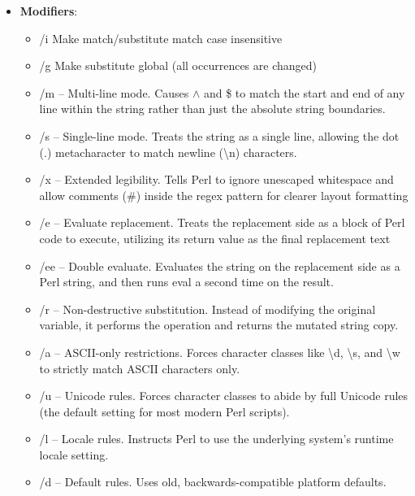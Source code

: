 \documentclass{report}
\begin{document}
\begin{itemize}
            \bigbreak \noindent 
            In Perl, \$1, \$2, \$3 (and so on) are special variables that hold captured text from the most recent successful regular expression match.
        \item \textbf{Modifiers}: 
            \begin{itemize}
                \item /i Make match/substitute match case insensitive
                \item /g Make substitute global (all occurrences are changed)
                \item /m – Multi-line mode. Causes $\land$ and \$ to match the start and end of any line within the string rather than just the absolute string boundaries.
                \item /s – Single-line mode. Treats the string as a single line, allowing the dot (.) metacharacter to match newline (\textbackslash n) characters.
                \item /x – Extended legibility. Tells Perl to ignore unescaped whitespace and allow comments (\#) inside the regex pattern for clearer layout formatting
                \item /e – Evaluate replacement. Treats the replacement side as a block of Perl code to execute, utilizing its return value as the final replacement text
                \item /ee – Double evaluate. Evaluates the string on the replacement side as a Perl string, and then runs eval a second time on the result.
                \item /r – Non-destructive substitution. Instead of modifying the original variable, it performs the operation and returns the mutated string copy.
                \item /a – ASCII-only restrictions. Forces character classes like \textbackslash d, \textbackslash s, and \textbackslash w to strictly match ASCII characters only.
                \item /u – Unicode rules. Forces character classes to abide by full Unicode rules (the default setting for most modern Perl scripts).
                \item /l – Locale rules. Instructs Perl to use the underlying system's runtime locale setting.
                \item /d – Default rules. Uses old, backwards-compatible platform defaults.


\end{itemize}
\end{itemize}
\end{document}
